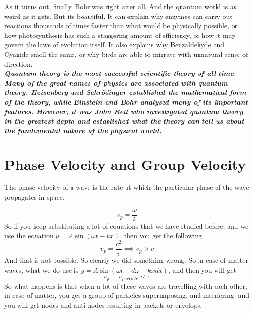 \documentclass[11pt]{article}
\begin{document}
As it turns out, finally, Bohr was right after all. And the quantum world is as weird as it gets. But its beautiful. It can explain why enzymes can carry out reactions thousands of times faster than what would be physically possible, or how photosynthesis has such a staggering amount of efficiency, or how it may govern the laws of evolution itself. It also explains why Benzaldehyde and Cyanide smell the same. or why birds are able to migrate with unnatural sense of direction. \\

\textit{\textbf{Quantum theory is the most successful scientific theory of all time. Many of the great names of physics are associated with quantum theory. Heisenberg and Schrödinger established the mathematical form of the theory, while Einstein and Bohr analysed many of its important features. However, it was John Bell who investigated quantum theory in the greatest depth and established what the theory can tell us about the fundamental nature of the physical world.} }
\clearpage
\section{Phase Velocity and Group Velocity}

The phase velocity of a wave is the rate at which the particular phase of the wave propagates in space. 

\begin{equation}
	v_p = \frac{\omega}{k}
\end{equation}
So if you keep substituting a lot of equations that we have studied before, and we use the equation $y = A\sin(\omega t - kx)$, then you get the following
\begin{equation}
	v_p = \frac{c^2}{v} \implies v_p > c
\end{equation}
And that is not possible. So clearly we did something wrong. 
So in case of matter waves, what we do use is $y = A\sin(\omega t + d\omega - kxdx)$, and then you will get
\begin{equation}
	v_p = v_{particle} < c
\end{equation}
So what happens is that when a lot of these waves are travelling with each other, in case of matter, you get a group of particles superimposing, and interfering, and you will get nodes and anti nodes resulting in packets or envelops. 
\end{document}

